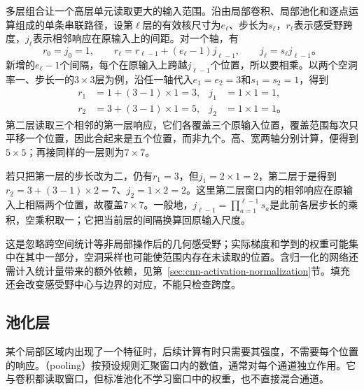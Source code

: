 多层组合让一个高层单元读取更大的输入范围。沿由局部卷积、局部池化和逐点运算组成的单条串联路径，设第$\ell$层的有效核尺寸为$e_\ell$、步长为$s_\ell$，$r_\ell$表示感受野跨度，$j_\ell$表示相邻响应在原输入上的间距。对一个轴，有
\begin{equation}
  r_0=j_0=1,\qquad
  r_\ell=r_{\ell-1}+(e_\ell-1)j_{\ell-1},\qquad
  j_\ell=s_\ell j_{\ell-1}\text{。}
  \label{eq:cnn-receptive-field}
\end{equation}
新增的$e_\ell-1$个间隔，每个在原输入上跨越$j_{\ell-1}$个位置，所以要相乘。以两个空洞率一、步长一的$3\times3$层为例，沿任一轴代入$e_1=e_2=3$和$s_1=s_2=1$，得到
\[
  \begin{aligned}
    r_1&=1+(3-1)\times1=3,& j_1&=1\times1=1,\\
    r_2&=3+(3-1)\times1=5,& j_2&=1\times1=1\text{。}
  \end{aligned}
\]
第二层读取三个相邻的第一层响应，它们各覆盖三个原输入位置，覆盖范围每次只平移一个位置，因此合起来是五个位置，而非九个。高、宽两轴分别计算，便得到$5\times5$；再接同样的一层则为$7\times7$。

若只把第一层的步长改为二，仍有$r_1=3$，但$j_1=2\times1=2$，第二层于是得到$r_2=3+(3-1)\times2=7$、$j_2=1\times2=2$。这里第二层窗口内的相邻响应在原输入上相隔两个位置，故覆盖$7\times7$。一般地，$j_{\ell-1}=\prod_{a=1}^{\ell-1}s_a$是此前各层步长的乘积，空乘积取一；它把当前层的间隔换算回原输入尺度。

这是忽略跨空间统计等非局部操作后的几何感受野；实际梯度和学到的权重可能集中在其中一部分，空洞采样也可能使范围内存在未读取的位置。含归一化的网络还需计入统计量带来的额外依赖，见第~\ref{sec:cnn-activation-normalization}节。填充还会改变感受野中心与边界的对应，不能只检查跨度。

\FloatBarrier

\subsection{池化层}
\label{sec:cnn-pooling}

某个局部区域内出现了一个特征时，后续计算有时只需要其强度，不需要每个位置的响应。（pooling）按预设规则汇聚窗口内的数值，通常对每个通道独立作用。它与卷积都读取窗口，但标准池化不学习窗口中的权重，也不直接混合通道。

